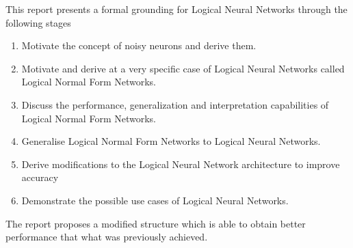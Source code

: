 This report presents a formal grounding for Logical Neural Networks through the following stages
\begin{enumerate}
	\item Motivate the concept of noisy neurons and derive them.
	\item Motivate and derive at a very specific case of Logical Neural Networks called Logical Normal Form Networks.
	\item Discuss the performance, generalization and interpretation capabilities of Logical Normal Form Networks.
	\item Generalise Logical Normal Form Networks to Logical Neural Networks.
	\item Derive modifications to the Logical Neural Network architecture to improve accuracy
	\item Demonstrate the possible use cases of Logical Neural Networks.
\end{enumerate}

 The report proposes a modified structure which is able to obtain better performance that what was previously achieved.